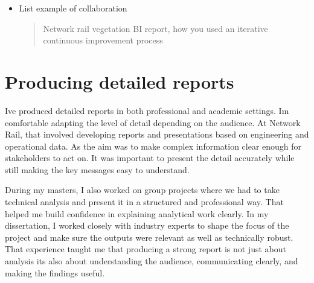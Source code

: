 \documentclass[
  letterpaper,
]{scrbook}
\begin{document}
\begin{itemize}
\begin{quote}
  \subsection{Performance metrics}\label{performance-metrics}

  \begin{itemize}
  \item
    KPI movement over time
  \item
    period-on-period comparisons
  \item
    count of issues / restrictions / events
  \item
    trend direction
  \item
    thresholds breached
  \item
    concentration by area / route / asset group
  \item
    backlog / open vs resolved items
  \item
    performance against target
  \end{itemize}
  \end{quote}
\item
  List example of collaboration

  \begin{quote}
  Network rail vegetation BI report, how you used an iterative
  continuous improvement process
  \end{quote}
\end{itemize}

\section{Producing detailed reports}\label{producing-detailed-reports}

I\textquotesingle ve produced detailed reports in both professional and
academic settings. I\textquotesingle m comfortable adapting the level of
detail depending on the audience. At Network Rail, that involved
developing reports and presentations based on engineering and
operational data. As the aim was to make complex information clear
enough for stakeholders to act on. It was important to present the
detail accurately while still making the key messages easy to
understand.

During my master\textquotesingle s, I also worked on group projects
where we had to take technical analysis and present it in a structured
and professional way. That helped me build confidence in explaining
analytical work clearly. In my dissertation, I worked closely with
industry experts to shape the focus of the project and make sure the
outputs were relevant as well as technically robust. That experience
taught me that producing a strong report is not just about analysis
it\textquotesingle s also about understanding the audience,
communicating clearly, and making the findings useful.
\end{document}
